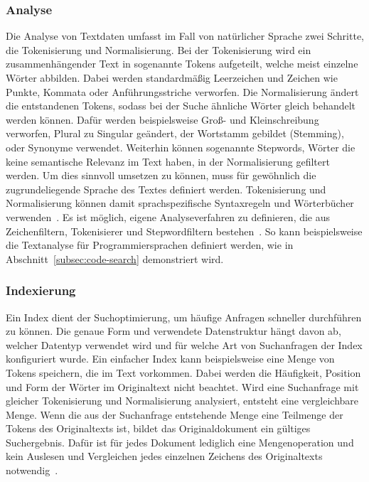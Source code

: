 \subsubsection{Analyse}
Die Analyse von Textdaten umfasst im Fall von natürlicher Sprache zwei Schritte, die Tokenisierung und Normalisierung.
Bei der Tokenisierung wird ein zusammenhängender Text in sogenannte Tokens aufgeteilt, welche meist einzelne Wörter abbilden.
Dabei werden standardmäßig Leerzeichen und Zeichen wie Punkte, Kommata oder Anführungsstriche verworfen.
Die Normalisierung ändert die entstandenen Tokens, sodass bei der Suche ähnliche Wörter gleich behandelt werden können.
Dafür werden beispielsweise Groß- und Kleinschreibung verworfen, Plural zu Singular geändert, der Wortstamm gebildet (Stemming), oder Synonyme verwendet.
Weiterhin können sogenannte Stepwords, Wörter die keine semantische Relevanz im Text haben, in der Normalisierung gefiltert werden.
Um dies sinnvoll umsetzen zu können, muss für gewöhnlich die zugrundeliegende Sprache des Textes definiert werden.
Tokenisierung und Normalisierung können damit sprachspezifische Syntaxregeln und Wörterbücher verwenden~\cite{elastic-analysis-overview}.
Es ist möglich, eigene Analyseverfahren zu definieren, die aus Zeichenfiltern, Tokenisierer und Stepwordfiltern bestehen~\cite{elastic-custom-analyser}.
So kann beispielsweise die Textanalyse für Programmiersprachen definiert werden, wie in Abschnitt~\ref{subsec:code-search} demonstriert wird.

\subsubsection{Indexierung}
Ein Index dient der Suchoptimierung, um häufige Anfragen schneller durchführen zu können.
Die genaue Form und verwendete Datenstruktur hängt davon ab, welcher Datentyp verwendet wird und für welche Art von Suchanfragen der Index konfiguriert wurde.
Ein einfacher Index kann beispielsweise eine Menge von Tokens speichern, die im Text vorkommen.
Dabei werden die Häufigkeit, Position und Form der Wörter im Originaltext nicht beachtet.
Wird eine Suchanfrage mit gleicher Tokenisierung und Normalisierung analysiert, entsteht eine vergleichbare Menge.
Wenn die aus der Suchanfrage entstehende Menge eine Teilmenge der Tokens des Originaltexts ist, bildet das Originaldokument ein gültiges Suchergebnis.
Dafür ist für jedes Dokument lediglich eine Mengenoperation und kein Auslesen und Vergleichen jedes einzelnen Zeichens des Originaltexts notwendig~\cite{elastic-index-search-time}.

